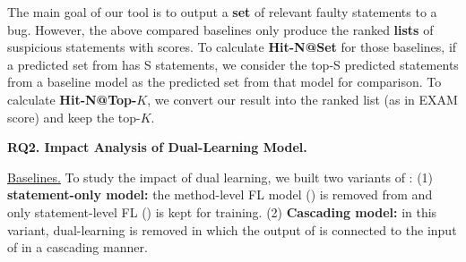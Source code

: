 

The main goal of our tool is to output a {\bf set} of relevant faulty
statements to a bug. However, the above compared baselines only
produce the ranked {\bf lists} of suspicious statements with scores.
%
To calculate \textbf{Hit-N@Set} for those baselines, if a predicted
set from {\tool} has S statements, we consider the top-S predicted
statements from a baseline model as the predicted set from that model
for comparison.
%
To calculate {\bf Hit-N@Top-$K$}, we convert our result into
the ranked list (as in EXAM score) and keep the top-$K$.





{\bf RQ2. Impact Analysis of Dual-Learning Model.}

\underline{Baselines.} To study the impact of dual learning, we built two variants of {\tool}: 
(1) \textbf{statement-only model:} the method-level FL model
() is removed from {\tool} and only statement-level FL
() is kept for training. (2) \textbf{Cascading model:} in
this variant, dual-learning is removed in which the output
of  is connected to the input of  in a
cascading manner.


